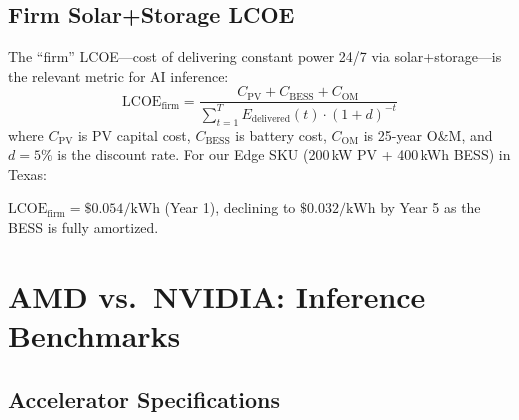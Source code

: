 \documentclass[conference,10pt,letterpaper]{IEEEtran}
\begin{document}
\subsection{Firm Solar+Storage LCOE}

The ``firm'' LCOE---cost of delivering constant power 24/7 via solar+storage---is the relevant metric for AI inference:
\begin{equation}
\text{LCOE}_{\text{firm}} = \frac{C_{\text{PV}} + C_{\text{BESS}} + C_{\text{OM}}}{\sum_{t=1}^{T} E_{\text{delivered}}(t) \cdot (1+d)^{-t}}
\end{equation}
where $C_{\text{PV}}$ is PV capital cost, $C_{\text{BESS}}$ is battery cost, $C_{\text{OM}}$ is 25-year O\&M, and $d=5\%$ is the discount rate. For our Edge SKU (200\,kW PV + 400\,kWh BESS) in Texas:

$\text{LCOE}_{\text{firm}} = \$0.054/\text{kWh}$ (Year 1), declining to $\$0.032/\text{kWh}$ by Year 5 as the BESS is fully amortized.

\section{AMD vs.\ NVIDIA: Inference Benchmarks}
\label{sec:benchmarks}

\subsection{Accelerator Specifications}

\begin{table}[!t]
\caption{Accelerator Specifications (2026)}
\label{tab:specs}
\centering\scriptsize
{}
\end{table}
\end{document}
